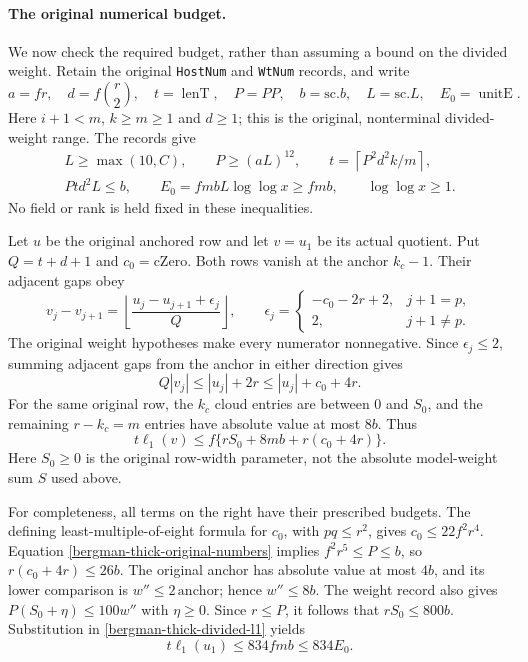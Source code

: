 \paragraph{The original numerical budget.}
We now check the required budget, rather than assuming a bound on
the divided weight.  Retain the original \texttt{HostNum} and
\texttt{WtNum} records, and write
\[
 a=fr,\quad d=f\binom r2,\quad t=\operatorname{lenT},
 \quad P=PP,\quad b=\mathrm{sc}.b,\quad L=\mathrm{sc}.L,
 \quad E_0=\operatorname{unitE}.
\]
Here $i+1<m$, $k\geq m\geq1$ and $d\geq1$; this is the
original, nonterminal divided-weight range.  The records give
\begin{equation}\label{bergman-thick-original-numbers}
 \begin{gathered}
 L\geq\max(10,C),\qquad P\geq(aL)^{12},\qquad
 t=\left\lceil P^2d^2k/m\right\rceil,\\
 Ptd^2L\leq b,\qquad
 E_0=fmbL\log\log x\geq fmb,\qquad \log\log x\geq1.
 \end{gathered}
\end{equation}
No field or rank is held fixed in these inequalities.

Let $u$ be the original anchored row and let $v=u_1$ be its
actual quotient.  Put $Q=t+d+1$ and $c_0=\mathrm{cZero}$.
Both rows vanish at the anchor $k_c-1$.  Their adjacent gaps obey
\[
 v_j-v_{j+1}=\left\lfloor
 \frac{u_j-u_{j+1}+\epsilon_j}{Q}\right\rfloor,
 \qquad
 \epsilon_j=\begin{cases}-c_0-2r+2,&j+1=p,\\2,&j+1\ne p.
 \end{cases}
\]
The original weight hypotheses make every numerator nonnegative.
Since $\epsilon_j\leq2$, summing adjacent gaps from the anchor
in either direction gives
\[
 Q|v_j|\leq |u_j|+2r\leq |u_j|+c_0+4r.
\]
For the same original row, the $k_c$ cloud entries are between
$0$ and $S_0$, and the remaining $r-k_c=m$ entries have absolute
value at most $8b$.  Thus
\begin{equation}\label{bergman-thick-divided-l1}
 t\ell_1(v)\leq f\{rS_0+8mb+r(c_0+4r)\}.
\end{equation}
Here $S_0\geq0$ is the original row-width parameter, not the
absolute model-weight sum $S$ used above.

For completeness, all terms on the right have their prescribed
budgets.  The defining least-multiple-of-eight formula for $c_0$,
with $pq\leq r^2$, gives $c_0\leq22f^2r^4$.
Equation \eqref{bergman-thick-original-numbers} implies
$f^2r^5\leq P\leq b$, so $r(c_0+4r)\leq26b$.
The original anchor has absolute value at most $4b$, and its
lower comparison is $w''\leq2\,\mathrm{anchor}$; hence
$w''\leq8b$.  The weight record also gives
$P(S_0+\eta)\leq100w''$ with $\eta\geq0$.
Since $r\leq P$, it follows that $rS_0\leq800b$.
Substitution in \eqref{bergman-thick-divided-l1} yields
\begin{equation}\label{bergman-thick-834}
                     t\ell_1(u_1)\leq834fmb\leq834E_0.
\end{equation}

